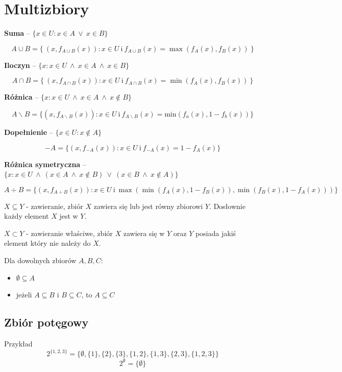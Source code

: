 \section{Multizbiory}

\textbf{Suma} -- $ \{ x \in U: x \in A \ \lor \ x \in B \} $

$$ A \cup B = \{ \ (x,f_{A \cup B} (x)): x \in U \ \textrm{i} \ f_{A \cup B}(x)=\max(f_A(x), f_B(x)) \ \} $$

\textbf{Iloczyn} -- $ \{ x: x \in U \ \land \ x \in A \ \land \ x \in B \} $

$$ A \cap B = \{ \ (x,f_{A \cap B} (x)): x \in U \ \textrm{i} \ f_{A \cap B}(x)=\min(f_A(x), f_B(x)) \ \} $$

\textbf{Różnica} -- $ \{ x: x \in U \ \land \ x \in A \ \land \ x \notin B \} $

$$ A \backslash B = \{ (x, f_{A \backslash B}(x)): x \in U \ \textrm{i} \ f_{A \backslash B}(x) = \textrm{min}(f_a(x), 1 - f_b(x)) \} $$

\textbf{Dopełnienie} -- $ \{ x \in U: x \notin A \} $

$$ - A = \{ (x, f_{-A}(x)): x \in U \ \textrm{i} \ f_{-A}(x) = 1 - f_{A}(x) \} $$

\textbf{Różnica symetryczna} -- $ \{ x: x \in U \ \land \ (x \in A \ \land \ x \notin B) \ \lor \ (x \in B \ \land \ x \notin A) \} $

$$ A \div B = \{ (x, f_{A \div B}(x)): x \in U \ \textrm{i} \ \max(\min(f_A(x), 1-f_B(x)), \min(f_B(x), 1-f_A(x))) \} $$ \medskip

$ X \subseteq Y $ - zawieranie, zbiór $X$ zawiera się lub jest równy zbiorowi $Y$.
Dosłownie każdy element $X$ jest w $Y$.

$ X \subset Y $ - zawieranie właściwe, zbiór $X$ zawiera się w $Y$ oraz $Y$ posiada jakiś element
który nie należy do $X$.

Dla dowolnych zbiorów $A, B, C$:
\begin{itemize}
    \item $\emptyset \subseteq A$
    \item jeżeli $ A \subseteq B $ i $ B \subseteq C $, to $ A \subseteq C $
\end{itemize}

\subsection{Zbiór potęgowy}
Przykład
$$ 2^{\{1, 2, 3\}} = \{\emptyset, \{1\}, \{2\}, \{3\}, \{1,2\}, \{1,3\}, \{2,3\}, \{1,2,3\}\} $$
$$ 2^{\emptyset} = \{ \emptyset \} $$

